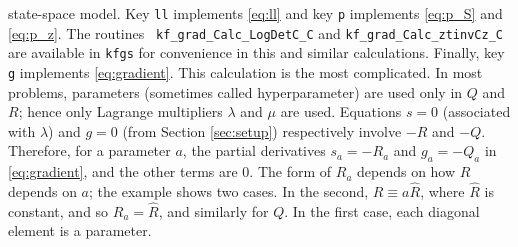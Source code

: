 \documentclass[10pt,fleqn]{article}
\begin{document}
state-space model. Key {\tt ll} implements \eqref{eq:ll} and key {\tt p}
implements \eqref{eq:p_S} and \eqref{eq:p_z}. The routines {\tt
  kf\_grad\_Calc\_LogDetC\_C} and {\tt kf\_grad\_Calc\_ztinvCz\_C} are available
in {\tt kfgs} for convenience in this and similar calculations. Finally, key
{\tt g} implements \eqref{eq:gradient}. This calculation is the most
complicated. In most problems, parameters (sometimes called hyperparameter) are
used only in $Q$ and $R$; hence only Lagrange multipliers $\lambda$ and $\mu$
are used. Equations $s = 0$ (associated with $\lambda$) and $g = 0$ (from
Section \ref{sec:setup}) respectively involve $-R$ and $-Q$. Therefore, for a
parameter $a$, the partial derivatives $s_a = -R_a$ and $g_a = -Q_a$ in
\eqref{eq:gradient}, and the other terms are $0$. The form of $R_a$ depends on
how $R$ depends on $a$; the example shows two cases. In the second, $R \equiv a
\hat R$, where $\hat R$ is constant, and so $R_a = \hat R$, and similarly for
$Q$. In the first case, each diagonal element is a parameter.
\end{document}
